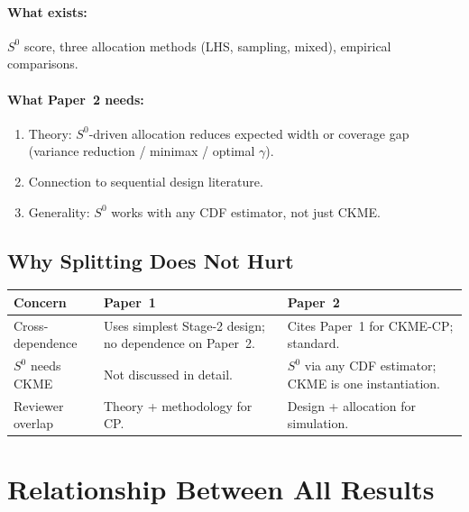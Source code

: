 \documentclass[11pt]{article}
\begin{document}
\paragraph{What exists:} $S^0$ score, three allocation methods (LHS,
sampling, mixed), empirical comparisons.

\paragraph{What Paper~2 needs:}
\begin{enumerate}
  \item Theory: $S^0$-driven allocation reduces expected width or
    coverage gap (variance reduction / minimax / optimal $\gamma$).
  \item Connection to sequential design literature.
  \item Generality: $S^0$ works with any CDF estimator, not just CKME.
\end{enumerate}

\subsection{Why Splitting Does Not Hurt}

\begin{center}
\begin{tabular}{@{}lp{5.5cm}p{5.5cm}@{}}
\toprule
\textbf{Concern} & \textbf{Paper~1} & \textbf{Paper~2} \\
\midrule
Cross-dependence &
  Uses simplest Stage-2 design; no dependence on Paper~2. &
  Cites Paper~1 for CKME-CP; standard. \\
\addlinespace
$S^0$ needs CKME &
  Not discussed in detail. &
  $S^0$ via any CDF estimator; CKME is one instantiation. \\
\addlinespace
Reviewer overlap &
  Theory + methodology for CP. &
  Design + allocation for simulation. \\
\bottomrule
\end{tabular}
\end{center}


\section{Relationship Between All Results}
\label{sec:relationships}
\end{document}
